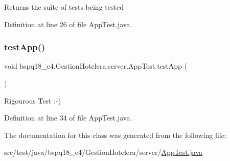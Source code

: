 \begin{DoxyReturn}{Returns}
the suite of tests being tested 
\end{DoxyReturn}


Definition at line 26 of file App\+Test.\+java.

\mbox{\label{classbspq18__e4_1_1_gestion_hotelera_1_1server_1_1_app_test_a46033a544062fc8342a03b218f8b2326}} 
\subsubsection{\texorpdfstring{test\+App()}{testApp()}}
{\footnotesize\ttfamily void bspq18\+\_\+e4.\+Gestion\+Hotelera.\+server.\+App\+Test.\+test\+App (\begin{DoxyParamCaption}{ }\end{DoxyParamCaption})}

Rigourous Test \+:-\/) 

Definition at line 34 of file App\+Test.\+java.



The documentation for this class was generated from the following file\+:\begin{DoxyCompactItemize}
\item 
src/test/java/bspq18\+\_\+e4/\+Gestion\+Hotelera/server/\mbox{\hyperlink{_app_test_8java}{App\+Test.\+java}}\end{DoxyCompactItemize}
